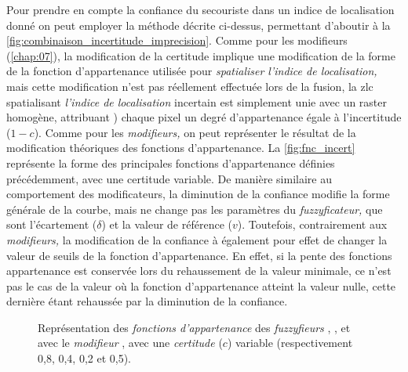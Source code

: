 {Pour prendre en compte la confiance du secouriste dans un indice de
localisation donné on peut employer la méthode décrite ci-dessus,
permettant d'aboutir à la
\autoref{fig:combinaison_incertitude_imprecision}. Comme pour les
modifieurs (\autoref{chap:07}), la modification de la certitude
implique une modification de la forme de la fonction d'appartenance
utilisée pour \emph{spatialiser l'indice de localisation,} mais cette
modification n'est pas réellement effectuée lors de la fusion, la
\ac{zlc} spatialisant \emph{l'indice de localisation} incertain est
simplement unie avec un raster homogène, attribuant ) chaque pixel un
degré d'appartenance égale à l'incertitude (\(1-c\)). Comme pour les
\emph{modifieurs,} on peut représenter le résultat de la modification
théoriques des fonctions d'appartenance. La \autoref{fig:fnc_incert}
représente la forme des principales fonctions d'appartenance définies
précédemment, avec une certitude variable. De manière similaire au
comportement des modificateurs, la diminution de la confiance modifie
la forme générale de la courbe, mais ne change pas les paramètres du
\emph{fuzzyficateur,} que sont l'écartement (\(\delta\)) et la valeur
de référence (\(v\)). Toutefois, contrairement aux \emph{modifieurs,}
la modification de la confiance à également pour effet de changer la
valeur de seuils de la fonction d'appartenance. En effet, si la pente
des fonctions appartenance est conservée lors du rehaussement de la
valeur minimale, ce n'est pas le cas de la valeur où la fonction
d'appartenance atteint la valeur nulle, cette dernière étant rehaussée
par la diminution de la confiance.

\begin{figure}
  \centering  \subfloat[\label{fig:fnc_app_inc}]{}\hfill
  \subfloat[\label{fig:fnc_app_inc_2}]{}

  \subfloat[\label{fig:fnc_app_inc_3}]{}\hfill
  \subfloat[\label{fig:fnc_app_inc_4}]{}
  \caption[Représentation des \emph{fonctions d'appartenance} de
  différents \emph{fuzzyfieurs} avec une
  \emph{incertitude}]{Représentation des \emph{fonctions
      d'appartenance} des \emph{fuzzyfieurs}
    \protect{} \protect{},
    \protect{} \protect{},
    \protect{} \protect{}
    et \protect{} avec le \emph{modifieur}
    \protect{} \protect{}, avec
    une \emph{certitude} (\(c\)) variable (respectivement 0,8, 0,4,
    0,2 et 0,5).}
  \label{fig:fnc_incert}
\end{figure}

}
